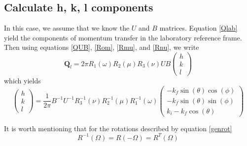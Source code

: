 \documentclass[prb]{revtex4}%
\begin{document}
\subsection{Calculate h, k, l components}

In this case, we assume that we know the $U$ and $B$ matrices. Equation \ref{Qlab}
yield the components of momentum transfer in the laboratory reference frame. Then using
equations \ref{QUB}, \ref{Rom}, \ref{Rmu}, and \ref{Rnu}, we write
\begin{equation}
  \textbf{Q}_l = 2 \pi R_1(\omega) R_2(\mu) R_3(\nu)  U  B \left(\begin{array}{c}
                                                            h \\
                                                            k \\
                                                            l
                                                          \end{array}\right)
\end{equation}
which yields
\begin{equation}\label{getHKL}
  \left(\begin{array}{c}
                                                            h \\
                                                            k \\
                                                            l
                                                          \end{array}\right) =
     \frac{1}{2 \pi}  B^{-1} U^{-1} R_3^{-1}(\nu) R_2^{-1}(\mu) R_1^{-1}(\omega)
     \left(\begin{array}{c}
                                                            -k_f\sin(\theta)\cos(\phi) \\
                                                            -k_f\sin(\theta)\sin(\phi) \\
                                                            k_i-k_f\cos(\theta)
                                                          \end{array}\right)
\end{equation}

It is worth mentioning that for the rotations described by equation \ref{genrot}
\begin{equation}\label{rotinv}
    R^{-1}(\Omega) = R(-\Omega) = R^{T}(\Omega)
\end{equation}
\end{document}
